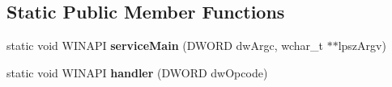 \subsection*{Static Public Member Functions}
\begin{DoxyCompactItemize}
\item 
\mbox{\label{class_qt_service_sys_private_a0ebf25dd25c87974b313c79b696aec6e}} 
static void W\+I\+N\+A\+PI {\bfseries service\+Main} (D\+W\+O\+RD dw\+Argc, wchar\+\_\+t $\ast$$\ast$lpsz\+Argv)
\item 
\mbox{\label{class_qt_service_sys_private_abec91d93c5a6562dfac877e4074c24d2}} 
static void W\+I\+N\+A\+PI {\bfseries handler} (D\+W\+O\+RD dw\+Opcode)
\end{DoxyCompactItemize}
